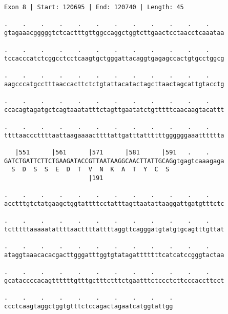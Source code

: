 \documentclass{article}
\begin{document}
\begin{Verbatim}
Exon 8 | Start: 120695 | End: 120740 | Length: 45
 
.    .    .    .    .    .    .    .    .    .    .    .    
gtagaaacgggggtctcactttgttggccaggctggtcttgaactcctaacctcaaataa
  
.    .    .    .    .    .    .    .    .    .    .    .    
tccacccatctcggcctcctcaagtgctgggattacaggtgagagccactgtgcctggcg
  
.    .    .    .    .    .    .    .    .    .    .    .    
aagcccatgcctttaaccacttctctgtattacatactagcttaactagcattgtacctg
  
.    .    .    .    .    .    .    .    .    .    .    .    
ccacagtagatgctcagtaaatatttctagttgaatatctgtttttcaacaagtacattt
  
.    .    .    .    .    .    .    .    .    .    .    .    
ttttaacccttttaattaagaaaacttttattgatttattttttggggggaaatttttta
  
   |551      |561      |571      |581      |591   .    .    
GATCTGATTCTTCTGAAGATACCGTTAATAAGGCAACTTATTGCAGgtgagtcaaagaga
  S  D  S  S  E  D  T  V  N  K  A  T  Y  C  S               
                       |191                                 
  
.    .    .    .    .    .    .    .    .    .    .    .    
acctttgtctatgaagctggtattttcctatttagttaatattaaggattgatgtttctc
  
.    .    .    .    .    .    .    .    .    .    .    .    
tctttttaaaaatattttaacttttattttaggttcagggatgtatgtgcagtttgttat
  
.    .    .    .    .    .    .    .    .    .    .    .    
ataggtaaacacacgacttgggatttggtgtatagatttttttcatcatccgggtactaa
  
.    .    .    .    .    .    .    .    .    .    .    .    
gcataccccacagttttttgtttgctttctttctgaatttctccctcttcccaccttcct
  
.    .    .    .    .    .    .    .    .    .
ccctcaagtaggctggtgtttctccagactagaatcatggtattgg
\end{Verbatim}
\newpage
\end{document}
